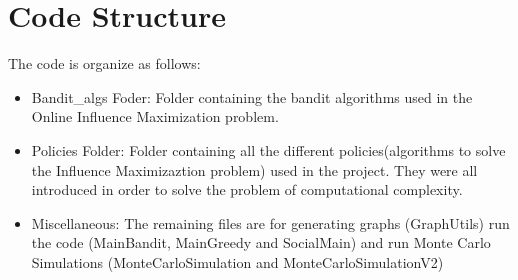 \newpage
\section{Code Structure}

The code is organize as follows: 
\begin{itemize}
	\item{Bandit\_algs Foder:} Folder containing the bandit algorithms used in the Online Influence Maximization problem.
	\item{Policies Folder:} Folder containing all the different policies(algorithms to solve the Influence Maximizaztion problem) used in the project. They were all introduced in order to solve the problem of computational complexity.
	\item{Miscellaneous: } The remaining files are for generating graphs (GraphUtils) run the code (MainBandit, MainGreedy and SocialMain) and run Monte Carlo Simulations (MonteCarloSimulation and MonteCarloSimulationV2)
\end{itemize}